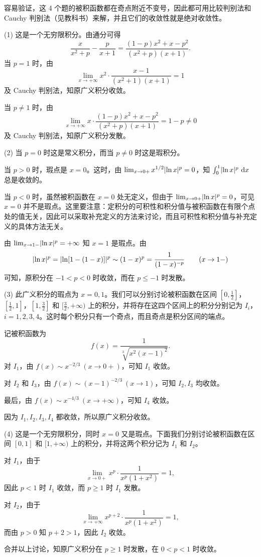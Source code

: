\begin{xsolution}
容易验证，这 4 个题的被积函数都在奇点附近不变号，因此都可用比较判别法和 Cauchy 判别法（见教科书）来解，并且它们的收敛性就是绝对收敛性。

(1) 这是一个无穷限积分。由通分可得
\[
  \frac{x}{x^2+p}-\frac{p}{x+1}
  =\frac{(1-p)x^2+x-p^2}{(x^2+p)(x+1)}.
\]
当 $p=1$ 时，由
\[
  \lim_{x\to+\infty}x^2\cdot\frac{x-1}{(x^2+1)(x+1)}=1
\]
及 Cauchy 判别法，知原广义积分收敛。

当 $p\neq1$ 时，由
\[
  \lim_{x\to+\infty}x\cdot\frac{(1-p)x^2+x-p^2}{(x^2+p)(x+1)}=1-p\neq0
\]
及 Cauchy 判别法，知原广义积分发散。

(2) 当 $p=0$ 时这是常义积分，而当 $p\neq0$ 时这是瑕积分。

当 $p>0$ 时，瑕点是 $x=0$。这时，由 $\lim_{x\to0+}x^{1/2}\lvert\ln x\rvert^p=0$，知 $\int_0^1\lvert\ln x\rvert^p\,\mathop{}\!\mathrm{d} x$ 总是收敛的。

当 $p<0$ 时，虽然被积函数在 $x=0$ 处无定义，但由于 $\lim_{x\to0+}\lvert\ln x\rvert^p=0$，可见 $x=0$ 并不是瑕点。这里要注意：定积分的可积性和积分值与被积函数在有限个点处的值无关，因此可以采取补充定义的方法来讨论，而且可积性和积分值与补充定义的具体方法无关。

由 $\lim_{x\to1-}\lvert\ln x\rvert^p=+\infty$ 知 $x=1$ 是瑕点。由
\[
  \lvert\ln x\rvert^p=\lvert\ln[1-(1-x)]\rvert^p\sim(1-x)^p=\frac1{(1-x)^{-p}}\qquad(x\to1-)
\]
可知，原积分在 $-1<p<0$ 时收敛，而在 $p\leq-1$ 时发散。

(3) 此广义积分的瑕点为 $x=0,1$。我们可以分别讨论被积函数在区间 $[0,\frac12]$，$[\frac12,1]$，$[1,\frac32]$ 和 $[\frac32,+\infty)$ 上的积分，并将存在这四个区间上的积分分别记为 $I_i$，$i=1,2,3,4$。这时每个积分只有一个奇点，而且奇点是积分区间的端点。

记被积函数为
\[
  f(x)=\frac1{\sqrt[3]{x^2(x-1)^2}}.
\]
对 $I_1$，由 $f(x)\sim x^{-2/3}\ (x\to0+)$，可知 $I_1$ 收敛。

对 $I_2$ 和 $I_3$，由 $f(x)\sim(x-1)^{-2/3}\ (x\to1)$，可知 $I_2,I_3$ 均收敛。

最后，由 $f(x)\sim x^{-4/3}\ (x\to+\infty)$，可知 $I_4$ 收敛。

因为 $I_1,I_2,I_3,I_4$ 都收敛，所以原广义积分收敛。

(4) 这是一个无穷限积分，同时 $x=0$ 又是瑕点。下面我们分别讨论被积函数在区间 $[0,1]$ 和 $[1,+\infty)$ 上的积分，并将这两个积分记为 $I_1$ 和 $I_2$。

对 $I_1$，由于
\[
  \lim_{x\to0+}x^p\cdot\frac1{x^p(1+x^2)}=1,
\]
因此 $p<1$ 时 $I_1$ 收敛，而 $p\geq1$ 时 $I_1$ 发散。

对 $I_2$，由于
\[
  \lim_{x\to+\infty}x^{p+2}\cdot\frac1{x^p(1+x^2)}=1,
\]
而由 $p>0$ 知 $p+2>1$，因此 $I_2$ 收敛。

合并以上讨论，知原广义积分在 $p\geq1$ 时发散，在 $0<p<1$ 时收敛。
\end{xsolution}

